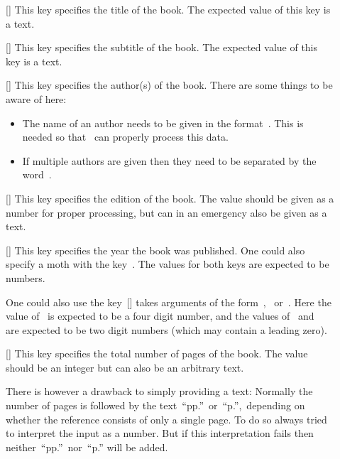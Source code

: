 \begin{description}
  \item[]
    [\optname]
    This key specifies the title of the book.
    The expected value of this key is a text.
  \item[]
    [\optname]
    This key specifies the subtitle of the book.
    The expected value of this key is a text.
  \item[]
    [\optname]
    This key specifies the author(s) of the book.
    There are some things to be aware of here:
    \begin{itemize}
      \item
        The name of an author needs to be given in the format~.
        This is needed so that~ can properly process this data.
      \item
        If multiple authors are given then they need to be separated by the word~.
    \end{itemize}
  \item[]
    [\optname]
    This key specifies the edition of the book.
    The value should be given as a number for proper processing, but can in an emergency also be given as a text.
  \item[]
    [\optname]
    This key specifies the year the book was published.
    One could also specify a moth with the key~.
    The values for both keys are expected to be numbers.
    
    One could also use the key~[\optname] takes arguments of the form~,~ or~.
    Here the value of~ is expected to be a four digit number, and the values of~ and~ are expected to be two digit numbers (which may contain a leading zero).
  \item[]
    [\optname]
    This key specifies the total number of pages of the book.
    The value should be an integer but can also be an arbitrary text.

    There is however a drawback to simply providing a text:
    Normally the number of pages is followed by the text~\enquote{pp.}\ or~\enquote{p.},\ depending on whether the reference consists of only a single page.
    To do so  always tried to interpret the input as a number.
    But if this interpretation fails then neither~\enquote{pp.}\ nor~\enquote{p.} will be added.


\end{description}
